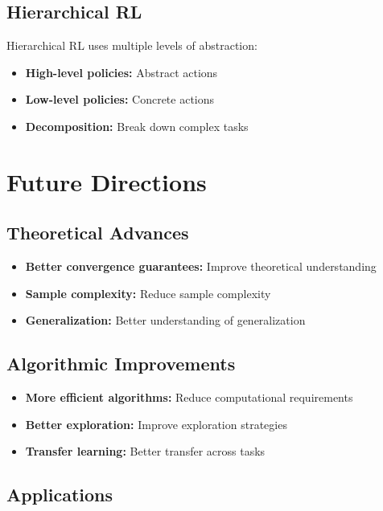 \subsection{Hierarchical RL}

Hierarchical RL uses multiple levels of abstraction:
\begin{itemize}
    \item \textbf{High-level policies:} Abstract actions
    \item \textbf{Low-level policies:} Concrete actions
    \item \textbf{Decomposition:} Break down complex tasks
\end{itemize}

\section{Future Directions}

\subsection{Theoretical Advances}

\begin{itemize}
    \item \textbf{Better convergence guarantees:} Improve theoretical understanding
    \item \textbf{Sample complexity:} Reduce sample complexity
    \item \textbf{Generalization:} Better understanding of generalization
\end{itemize}

\subsection{Algorithmic Improvements}

\begin{itemize}
    \item \textbf{More efficient algorithms:} Reduce computational requirements
    \item \textbf{Better exploration:} Improve exploration strategies
    \item \textbf{Transfer learning:} Better transfer across tasks
\end{itemize}

\subsection{Applications}

